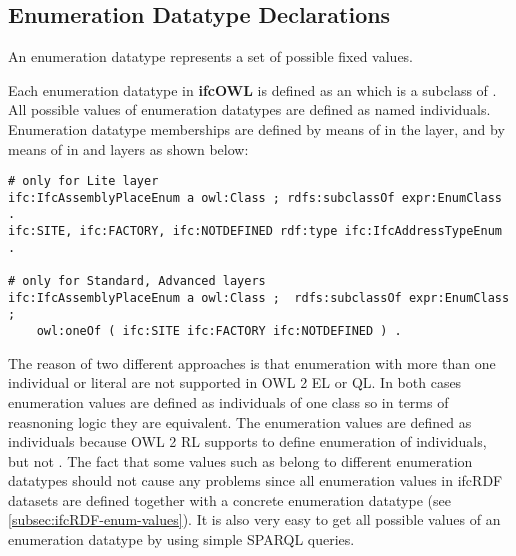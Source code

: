 
\subsection{Enumeration Datatype Declarations}
\label{subsec:ifcOWL-enum-types}

An enumeration data\-type represents a set of possible fixed values. 

\begin{ontologyRule}
Each enumeration data\-type in \textbf{ifc\-OWL} is defined as an  which is a subclass of . All possible values of enumeration data\-types are defined as named individuals. Enumeration data\-type memberships are defined by means of  in the \lite{} layer, and by means of  in \standard{} and \advanced{} layers as shown below:
\begin{lstlisting}
# only for Lite layer
ifc:IfcAssemblyPlaceEnum a owl:Class ; rdfs:subclassOf expr:EnumClass .
ifc:SITE, ifc:FACTORY, ifc:NOTDEFINED rdf:type ifc:IfcAddressTypeEnum .
    
# only for Standard, Advanced layers
ifc:IfcAssemblyPlaceEnum a owl:Class ;  rdfs:subclassOf expr:EnumClass ;
    owl:oneOf ( ifc:SITE ifc:FACTORY ifc:NOTDEFINED ) .
\end{lstlisting}
\end{ontologyRule}

The reason of two different approaches is that enumeration with more than one individual or literal are not supported in OWL 2 EL or QL. In both cases enumeration values are defined as individuals of one class so in terms of reasnoning logic they are equivalent. The enumeration values are defined as individuals because OWL 2 RL supports  to define enumeration of individuals, but not  \cite{w3c:owl2-profiles}. The fact that some values such as  belong to different enumeration data\-types should not cause any problems since all enumeration values in ifc\-RDF datasets are defined together with a concrete enumeration data\-type (see \ref{subsec:ifcRDF-enum-values}). It is also very easy to get all possible values of an enumeration data\-type by using simple SPARQL queries.

